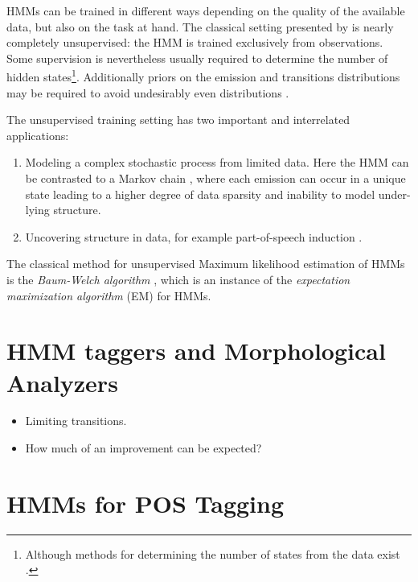 HMMs can be trained in different ways depending on the quality of the
available data, but also on the task at hand. The classical setting
presented by \cite{Rabiner1989} is nearly completely unsupervised: the
HMM is trained exclusively from observations. Some supervision is
nevertheless usually required to determine the number of hidden
states\footnote{Although methods for determining the number of states
  from the data exist \citep{foo}.}. Additionally priors on the
emission and transitions distributions may be required to avoid
undesirably even distributions
\citep{Cutting1992,Johnson2007}.

The unsupervised training setting has two important and
interrelated applications:
\begin{enumerate}
\item Modeling a complex stochastic process from limited data. Here
  the HMM can be contrasted to a Markov chain \citep[318--320]{Manning1999}, where
  each emission can occur in a unique state leading to a higher degree
  of data sparsity and inability to model under-lying structure.
\item Uncovering structure in data, for example part-of-speech
  induction \citep{Johnson2007}.
\end{enumerate}
The classical method for unsupervised Maximum likelihood estimation of
HMMs is the {\it Baum-Welch algorithm} \citep{Rabiner1989}, which is
an instance of the {\it expectation maximization algorithm} (EM)
\citep{Dempster1977} for HMMs.

\section{HMM taggers and Morphological Analyzers}
\begin{itemize}
\item Limiting transitions.
\item How much of an improvement can be expected?
\end{itemize}


\section{HMMs for POS Tagging}

